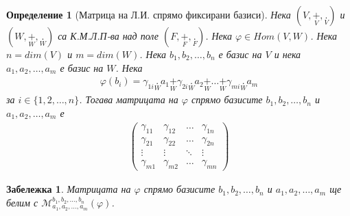 \documentclass[12pt]{article}
\newtheorem{remark}{{Забележка}}%
\newtheorem{definition}{Определение}%
\begin{document}
\begin{definition}[Матрица на Л.И. спрямо фиксирани базиси]
Нека \((V, \underset{V}{+}, \underset{V}{.})\) и \((W, \underset{W}{+}, \underset{W}{.})\) са К.М.Л.П-ва над поле \((F, \underset{F}{+}, \underset{F}{.})\).
Нека \(\varphi \in Hom(V, W)\).
Нека \(n = dim(V)\) и \(m = dim(W)\).
Нека \(b_1, b_2, \dots, b_n\) е базис на \(V\)
и нека \(a_1, a_2, \dots, a_m\) е базис на \(W\).
Нека
\begin{align*}
\varphi(b_i) = \gamma_{1i}\underset{W}{.}a_1 \underset{W}{+} \gamma_{2i}\underset{W}{.}a_2 \underset{W}{+} \dots \underset{W}{+} \gamma_{mi}\underset{W}{.}a_m
\end{align*}
за \(i \in \{1, 2, \dots, n\}\).
Тогава матрицата на \(\varphi\)
спрямо базисите \(b_1, b_2, \dots, b_n\) и \(a_1, a_2, \dots, a_m\) е
\begin{align*}
\begin{pmatrix}
    \gamma_{11} & \gamma_{12} & \dots & \gamma_{1n} \\
    \gamma_{21} & \gamma_{22} & \dots & \gamma_{2n} \\
    \vdots    & \vdots  & \ddots & \vdots \\
    \gamma_{m1} & \gamma_{m2} & \dots & \gamma_{mn}
\end{pmatrix}
\end{align*}
\end{definition}

\begin{remark}
Матрицата на \(\varphi\)
спрямо базисите \(b_1, b_2, \dots, b_n\) и \(a_1, a_2, \dots, a_m\) ще белим с \(\mathcal{M}_{a_1, a_2, \dots, a_m}^{b_1, b_2, \dots, b_n}(\varphi)\).
\end{remark}
\end{document}
